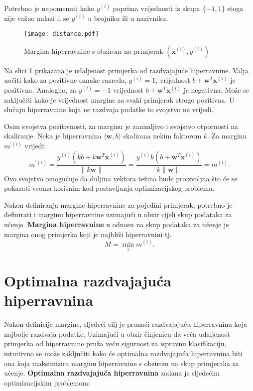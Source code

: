 \documentclass[times, utf8, zavrsni, numeric]{fer}
\newcommand{\hiperravnina}{$\langle \mathbf{w}, b \rangle$}
\begin{document}
Potrebno je napomenuti kako $y^{(i)}$ poprima vrijednosti iz skupa $\{-1, 1\}$ stoga nije važno nalazi li se $y^{(i)}$ u brojniku
ili u nazivniku.

\begin{figure}
\centering
\texttt{[image: distance.pdf]}
\caption{Margina hiperravnine s obzirom na primjerak $(\mathbf{x}^{(i)}, y^{(i)})$}
\label{fig:mex}
\end{figure}

\par Na slici \ref{fig:mex} prikazana je udaljenost primjerka od razdvajajuće hiperravnine.
Valja uočiti kako za pozitivne oznake razreda, $y^{(i)} = 1$, vrijednost $b + \mathbf{w}^T\mathbf{x}^{(i)}$ je pozitivna.
Analogno, za $y^{(i)} = -1$ vrijednost $b + \mathbf{w}^T\mathbf{x}^{(i)}$ je negativna.
Može se zaključiti kako je vrijednost margine za svaki primjerak strogo pozitivna. 
U slučaju hiperravnine koja ne razdvaja podatke to svojstvo ne vrijedi.

\par Osim svojstva pozitivnosti, za marginu je zanimljivo i svojstvo otpornosti na skaliranje. 
Neka je hiperravnina \hiperravnina{} skalirana nekim faktorom $k$. Za marginu $m^{'(i)}$ vrijedi:
\begin{equation*}
  m^{'(i)} = \frac{y^{(i)}(kb + k\mathbf{w}^T\mathbf{x}^{(i)})}{\|k\mathbf{w}\|} =
  \frac{y^{(i)}k(b + \mathbf{w}^T\mathbf{x}^{(i)})}{k\|\mathbf{w}\|} = m^{(i)}.
\end{equation*}
Ovo svojstvo omogućuje da duljina vektora težina bude proizvoljna što će se pokazati veoma korisnim kod
postavljanja optimizacijskog problema.

\par Nakon definiranja margine hiperravnine za pojedini primjerak, potrebno je definirati 
i marginu hiperravnine uzimajući u obzir cijeli skup podataka za učenje. 
\textbf{Margina hiperravnine} u odnosu na skup podataka za učenje 
je margina onog primjerka koji je najbliži hiperravnini tj.
$$M=\min_{i}m^{(i)}.$$

\section{Optimalna razdvajajuća hiperravnina} \label{opthiper}
Nakon definicije margine, sljedeći cilj je pronaći razdvajajuću hiperravninu koja najbolje razdvaja podatke.
Uzimajući u obzir činjenicu da veća udaljenost primjerka od hiperravnine pruža veću sigurnost za ispravnu
klasifikaciju, intuitivno se može zaključiti kako će optimalna razdvajajuća hiperravnina biti ona koja
maksimizira marginu hiperravnine s obzirom na skup primjeraka za učenje. 
\textbf{Optimalna razdvajajuća hiperravnina} zadana je sljedećim optimizacijskim problemom:
\end{document}
